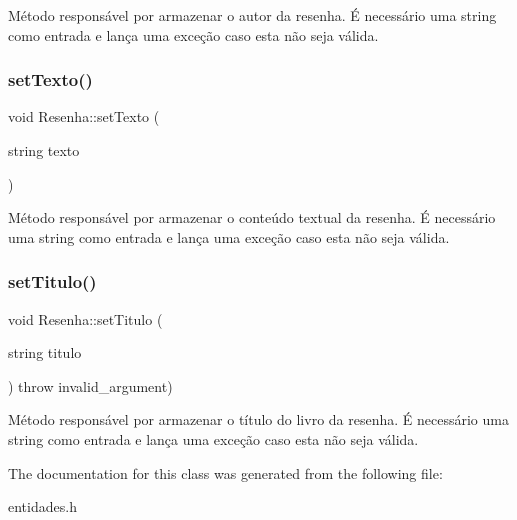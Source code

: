 Método responsável por armazenar o autor da resenha. É necessário uma string como entrada e lança uma exceção caso esta não seja válida. \mbox{\label{classResenha_ad760365db2202742706238d74fe55e6e}} 
\subsubsection{\texorpdfstring{set\+Texto()}{setTexto()}}
{\footnotesize\ttfamily void Resenha\+::set\+Texto (\begin{DoxyParamCaption}\item[{string}]{texto }\end{DoxyParamCaption})\hspace{0.3cm}{\ttfamily [inline]}}

Método responsável por armazenar o conteúdo textual da resenha. É necessário uma string como entrada e lança uma exceção caso esta não seja válida. \mbox{\label{classResenha_aa2e063e37df9f280258bf1bb492bf818}} 
\subsubsection{\texorpdfstring{set\+Titulo()}{setTitulo()}}
{\footnotesize\ttfamily void Resenha\+::set\+Titulo (\begin{DoxyParamCaption}\item[{string}]{titulo }\end{DoxyParamCaption}) throw  invalid\+\_\+argument) \hspace{0.3cm}{\ttfamily [inline]}}

Método responsável por armazenar o título do livro da resenha. É necessário uma string como entrada e lança uma exceção caso esta não seja válida. 

The documentation for this class was generated from the following file\+:\begin{DoxyCompactItemize}
\item 
entidades.\+h\end{DoxyCompactItemize}
